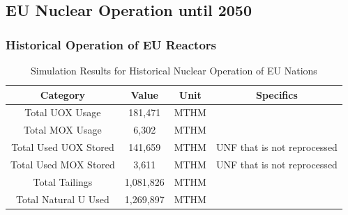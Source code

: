 \subsection{EU Nuclear Operation until 2050}

\begin{frame}
	\frametitle{Historical Operation of EU Reactors}
	
\begin{table}[h]
	\centering
		\begin{tabular}{cccc}
			\hline
			\textbf{Category } & \textbf{Value} & \textbf{Unit} & \textbf{Specifics}\\ \hline
			Total UOX Usage  & 181,471 & MTHM &  \\ 
			Total MOX Usage  & 6,302 & MTHM & \\ 
			Total Used UOX Stored  & 141,659 & MTHM & \gls{UNF} that is not reprocessed\\ 
			Total Used  MOX Stored  & 3,611 & MTHM & \gls{UNF} that is not reprocessed \\ 
			Total Tailings  & 1,081,826 & MTHM & \\ 
			Total Natural U Used  & 1,269,897 & MTHM & \\ \hline
		\end{tabular}
		\caption{Simulation Results for Historical Nuclear Operation of \gls{EU} Nations}
		\label{tab:sim_result}
\end {table}

\end{frame}


